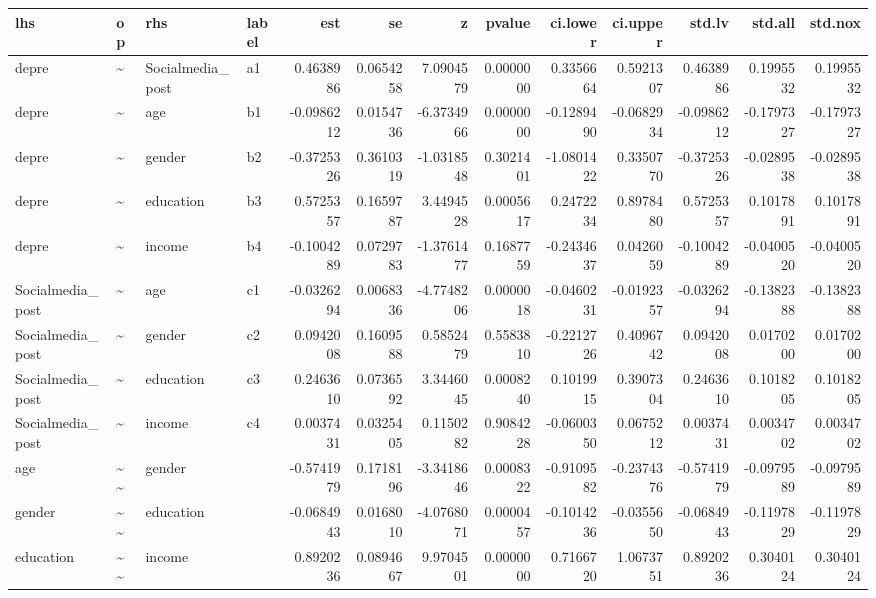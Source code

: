 \documentclass[
]{article}
\begin{document}
\begin{table}[!h]
\centering
\begin{tabular}[t]{llllrrrrrrrrr}
\toprule
lhs & op & rhs & label & est & se & z & pvalue & ci.lower & ci.upper & std.lv & std.all & std.nox\\
\midrule
depre & \textasciitilde{} & Socialmedia\_post & a1 & 0.4638986 & 0.0654258 & 7.0904579 & 0.0000000 & 0.3356664 & 0.5921307 & 0.4638986 & 0.1995532 & 0.1995532\\
depre & \textasciitilde{} & age & b1 & -0.0986212 & 0.0154736 & -6.3734966 & 0.0000000 & -0.1289490 & -0.0682934 & -0.0986212 & -0.1797327 & -0.1797327\\
depre & \textasciitilde{} & gender & b2 & -0.3725326 & 0.3610319 & -1.0318548 & 0.3021401 & -1.0801422 & 0.3350770 & -0.3725326 & -0.0289538 & -0.0289538\\
depre & \textasciitilde{} & education & b3 & 0.5725357 & 0.1659787 & 3.4494528 & 0.0005617 & 0.2472234 & 0.8978480 & 0.5725357 & 0.1017891 & 0.1017891\\
depre & \textasciitilde{} & income & b4 & -0.1004289 & 0.0729783 & -1.3761477 & 0.1687759 & -0.2434637 & 0.0426059 & -0.1004289 & -0.0400520 & -0.0400520\\
\addlinespace
Socialmedia\_post & \textasciitilde{} & age & c1 & -0.0326294 & 0.0068336 & -4.7748206 & 0.0000018 & -0.0460231 & -0.0192357 & -0.0326294 & -0.1382388 & -0.1382388\\
Socialmedia\_post & \textasciitilde{} & gender & c2 & 0.0942008 & 0.1609588 & 0.5852479 & 0.5583810 & -0.2212726 & 0.4096742 & 0.0942008 & 0.0170200 & 0.0170200\\
Socialmedia\_post & \textasciitilde{} & education & c3 & 0.2463610 & 0.0736592 & 3.3446045 & 0.0008240 & 0.1019915 & 0.3907304 & 0.2463610 & 0.1018205 & 0.1018205\\
Socialmedia\_post & \textasciitilde{} & income & c4 & 0.0037431 & 0.0325405 & 0.1150282 & 0.9084228 & -0.0600350 & 0.0675212 & 0.0037431 & 0.0034702 & 0.0034702\\
age & \textasciitilde{}\textasciitilde{} & gender &  & -0.5741979 & 0.1718196 & -3.3418646 & 0.0008322 & -0.9109582 & -0.2374376 & -0.5741979 & -0.0979589 & -0.0979589\\
\addlinespace
gender & \textasciitilde{}\textasciitilde{} & education &  & -0.0684943 & 0.0168010 & -4.0768071 & 0.0000457 & -0.1014236 & -0.0355650 & -0.0684943 & -0.1197829 & -0.1197829\\
education & \textasciitilde{}\textasciitilde{} & income &  & 0.8920236 & 0.0894667 & 9.9704501 & 0.0000000 & 0.7166720 & 1.0673751 & 0.8920236 & 0.3040124 & 0.3040124\\

\end{tabular}
\end{table}
\end{document}
